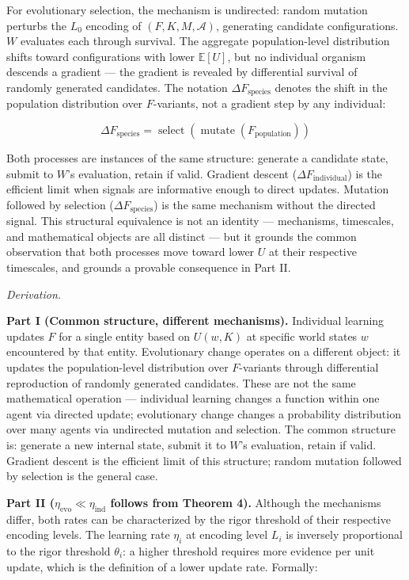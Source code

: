 \documentclass[
]{article}
\begin{document}
For evolutionary selection, the mechanism is undirected: random mutation
perturbs the \(L_0\) encoding of \((F, K, M, \mathcal{A})\), generating
candidate configurations. \(W\) evaluates each through survival. The
aggregate population-level distribution shifts toward configurations
with lower \(\mathbb{E}[U]\), but no individual organism descends a
gradient --- the gradient is revealed by differential survival of
randomly generated candidates. The notation
\(\Delta F_{\text{species}}\) denotes the shift in the population
distribution over \(F\)-variants, not a gradient step by any individual:

\[\Delta F_{\text{species}} = \operatorname{select}(\operatorname{mutate}(F_{\text{population}}))\]

Both processes are instances of the same structure: generate a candidate
state, submit to \(W\)'s evaluation, retain if valid. Gradient descent
(\(\Delta F_{\text{individual}}\)) is the efficient limit when signals
are informative enough to direct updates. Mutation followed by selection
(\(\Delta F_{\text{species}}\)) is the same mechanism without the
directed signal. This structural equivalence is not an identity ---
mechanisms, timescales, and mathematical objects are all distinct ---
but it grounds the common observation that both processes move toward
lower \(U\) at their respective timescales, and grounds a provable
consequence in Part II.

\emph{Derivation.}

\textbf{Part I (Common structure, different mechanisms).} Individual
learning updates \(F\) for a single entity based on \(U(w, K)\) at
specific world states \(w\) encountered by that entity. Evolutionary
change operates on a different object: it updates the population-level
distribution over \(F\)-variants through differential reproduction of
randomly generated candidates. These are not the same mathematical
operation --- individual learning changes a function within one agent
via directed update; evolutionary change changes a probability
distribution over many agents via undirected mutation and selection. The
common structure is: generate a new internal state, submit it to \(W\)'s
evaluation, retain if valid. Gradient descent is the efficient limit of
this structure; random mutation followed by selection is the general
case.

\textbf{Part II (\(\eta_{\text{evo}} \ll \eta_{\text{ind}}\) follows
from Theorem 4).} Although the mechanisms differ, both rates can be
characterized by the rigor threshold of their respective encoding
levels. The learning rate \(\eta_i\) at encoding level \(L_i\) is
inversely proportional to the rigor threshold \(\theta_i\): a higher
threshold requires more evidence per unit update, which is the
definition of a lower update rate. Formally:
\end{document}
